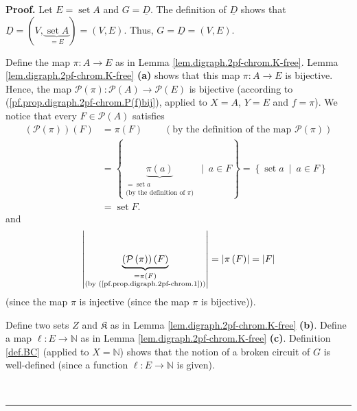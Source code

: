 \documentclass[numbers=enddot,12pt,final,onecolumn,notitlepage]{scrartcl}%
\theoremstyle{definition}
\newenvironment{proof}[1][Proof]{\noindent\textbf{#1.} }{\ \rule{0.5em}{0.5em}}
\newenvironment{verlong}{}{}
\begin{document}
\begin{verlong}
\begin{proof}
Let $E=\operatorname*{set}A$ and $G=\underline{D}$. The definition of
$\underline{D}$ shows that $\underline{D}=\left(
V,\underbrace{\operatorname*{set}A}_{=E}\right)  =\left(  V,E\right)  $. Thus,
$G=\underline{D}=\left(  V,E\right)  $.

Define the map $\pi:A\rightarrow E$ as in Lemma
\ref{lem.digraph.2pf-chrom.K-free}. Lemma \ref{lem.digraph.2pf-chrom.K-free}
\textbf{(a)} shows that this map $\pi:A\rightarrow E$ is bijective. Hence, the
map $\mathcal{P}\left(  \pi\right)  :\mathcal{P}\left(  A\right)
\rightarrow\mathcal{P}\left(  E\right)  $ is bijective (according to
(\ref{pf.prop.digraph.2pf-chrom.P(f)bij}), applied to $X=A$, $Y=E$ and $f=\pi
$). We notice that every $F\in\mathcal{P}\left(  A\right)  $ satisfies%
\begin{align}
\left(  \mathcal{P}\left(  \pi\right)  \right)  \left(  F\right)   &
=\pi\left(  F\right)  \ \ \ \ \ \ \ \ \ \ \left(  \text{by the definition of
the map }\mathcal{P}\left(  \pi\right)  \right)
\label{pf.prop.digraph.2pf-chrom.1}\\
&  =\left\{  \underbrace{\pi\left(  a\right)  }%
_{\substack{=\operatorname*{set}a\\\text{(by the definition of }\pi\text{)}%
}}\ \mid\ a\in F\right\}  =\left\{  \operatorname*{set}a\ \mid\ a\in F\right\}
\nonumber\\
&  =\operatorname*{set}F. \label{pf.prop.digraph.2pf-chrom.2}%
\end{align}
and%
\begin{equation}
\left\vert \underbrace{\left(  \mathcal{P}\left(  \pi\right)  \right)  \left(
F\right)  }_{\substack{=\pi\left(  F\right)  \\\text{(by
(\ref{pf.prop.digraph.2pf-chrom.1}))}}}\right\vert =\left\vert \pi\left(
F\right)  \right\vert =\left\vert F\right\vert
\label{pf.prop.digraph.2pf-chrom.4}%
\end{equation}
(since the map $\pi$ is injective (since the map $\pi$ is bijective)).

Define two sets $Z$ and $\mathfrak{K}$ as in Lemma
\ref{lem.digraph.2pf-chrom.K-free} \textbf{(b)}. Define a map $\ell
:E\rightarrow\mathbb{N}$ as in Lemma \ref{lem.digraph.2pf-chrom.K-free}
\textbf{(c)}. Definition \ref{def.BC} (applied to $X=\mathbb{N}$) shows that
the notion of a broken circuit of $G$ is well-defined (since a function
$\ell:E\rightarrow\mathbb{N}$ is given).


\end{proof}
\end{verlong}
\end{document}
